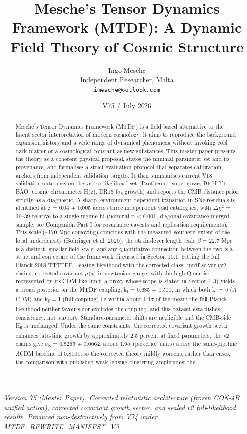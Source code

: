 \documentclass[11pt,a4paper]{article}
\title{Mesche's Tensor Dynamics Framework (MTDF): A Dynamic Field Theory of Cosmic Structure}
\author{Ingo Mesche\\ \small Independent Researcher, Malta \\ \small \texttt{imesche@outlook.com}}
\date{V75 / July 2026}
\begin{document}
\maketitle
\begin{center}\itshape Version 75 (Master Paper). Corrected relativistic architecture (frozen CON-4B unified action), corrected covariant growth sector, and sealed v2 full-likelihood results. Produced non-destructively from V74 under MTDF\_\allowbreak{}REWRITE\_\allowbreak{}MANIFEST\_\allowbreak{}V3.\end{center}




\begin{abstract}
Mesche's Tensor Dynamics Framework (MTDF) is a field based alternative to the latent sector interpretation of modern cosmology. It aims to reproduce the background expansion history and a wide range of dynamical phenomena without invoking cold dark matter or a cosmological constant as new substances. This master paper presents the theory as a coherent physical proposal, states the minimal parameter set and its provenance, and formalises a strict evaluation protocol that separates calibration anchors from independent validation targets. It then summarises current V18 validation outcomes on the vector likelihood set (Pantheon+ supernovae, DESI Y1 BAO, cosmic chronometer H(z), DR16 f$\sigma$$_{8}$ growth) and reports the CMB distance prior strictly as a diagnostic. A sharp, environment-dependent transition in SNe residuals is identified at z = 0.04 $\pm$ 0.005 across three independent void catalogues, with $\Delta$$\chi$$^{2}$ = 36--39 relative to a single-regime fit (nominal p < 0.001, diagonal-covariance merged sample; see Companion Part I for covariance caveats and replication requirements). This scale (\~{}170 Mpc comoving) coincides with the measured southern extent of the local underdensity (B\"ohringer et al. 2020); the strain-lever length scale $\beta$ = 22.7 Mpc is a distinct, smaller field scale, and any quantitative connection between the two is a structural conjecture of the framework discussed in Section 10.1. Fitting the full Planck 2018 TTTEEE+lensing likelihood with the corrected class\_\allowbreak{}mtdf solver (v2 chains; corrected covariant $\mu$(a) in newtonian gauge, with the high-Q carrier represented by its CDM-like limit, a proxy whose scope is stated in Section 7.3) yields a broad posterior on the MTDF coupling, k\textsubscript{f} = 0.685 $\pm$ 0.500, in which both k\textsubscript{f} = 0 ($\Lambda$CDM) and k\textsubscript{f} = 1 (full coupling) lie within about 1.4$\sigma$ of the mean: the full Planck likelihood neither favours nor excludes the coupling, and this dataset establishes consistency, not support. Standard-parameter shifts are negligible and the CMB-side H\textsubscript{0} is unchanged. Under the same constraints, the corrected covariant growth sector enhances late-time growth by approximately 2.5 percent at fixed parameters; the v2 chains give $\sigma$\textsubscript{8} = 0.8265 $\pm$ 0.0062, about 1.9$\sigma$ (posterior units) above the same-pipeline $\Lambda$CDM baseline of 0.8101, so the corrected theory mildly worsens, rather than eases, the comparison with published weak-lensing clustering amplitudes; the 
\end{abstract}
\end{document}
